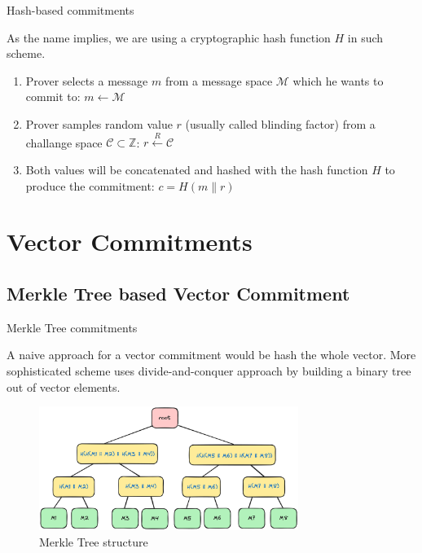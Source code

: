 \documentclass[xcolor={usenames,dvipsnames}]{beamer}
\begin{document}
    \begin{frame}{Hash-based commitments}

        As the name implies, we are using a cryptographic hash function \(H\) in such scheme.

        \begin{definition}
            \begin{enumerate}
                \item Prover selects a message $m$ from a message space $\mathcal{M}$ which he wants to commit to:
                    $m \leftarrow \mathcal{M}$
            
                \item Prover samples random value $r$ (usually called blinding factor) from a challange space $\mathcal{C} \subset \mathbb{Z}$:
                    $r \xleftarrow{R} \mathcal{C}$
                
                \item Both values will be concatenated and hashed with the hash function $H$ to produce the commitment:
                    $c = H(m \parallel r)$
            \end{enumerate}
        \end{definition}

    \end{frame}

    \section{Vector Commitments}

    \subsection{Merkle Tree based Vector Commitment}

    \begin{frame}{Merkle Tree commitments}

        A naive approach for a vector commitment would be hash the whole vector. 
        More sophisticated scheme uses divide-and-conquer approach by building a binary tree out of vector elements.

        \begin{figure}
            \centering
            \includegraphics[width=0.75\textwidth]{images/lecture_5/MerkleTree.png}
            \caption{Merkle Tree structure}
        \end{figure}

    \end{frame}
\end{document}
